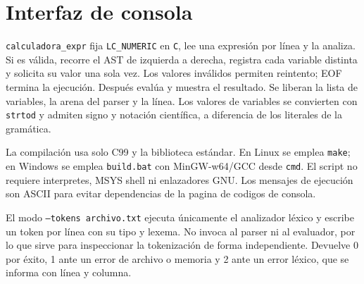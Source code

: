 \documentclass[11pt,a4paper]{article}
\begin{document}
\section{Interfaz de consola}
\texttt{calculadora\_expr} fija \texttt{LC\_NUMERIC} en \texttt{C}, lee una expresión por línea y la analiza. Si es válida, recorre el AST de izquierda a derecha, registra cada variable distinta y solicita su valor una sola vez. Los valores inválidos permiten reintento; EOF termina la ejecución. Después evalúa y muestra el resultado. Se liberan la lista de variables, la arena del parser y la línea. Los valores de variables se convierten con \texttt{strtod} y admiten signo y notación científica, a diferencia de los literales de la gramática.

La compilación usa solo C99 y la biblioteca estándar. En Linux se emplea \texttt{make}; en Windows se emplea \texttt{build.bat} con MinGW-w64/GCC desde \texttt{cmd}. El script no requiere interpretes, MSYS shell ni enlazadores GNU. Los mensajes de ejecución son ASCII para evitar dependencias de la pagina de codigos de consola.

El modo \texttt{--tokens archivo.txt} ejecuta únicamente el analizador léxico y escribe un token por línea con su tipo y lexema. No invoca al parser ni al evaluador, por lo que sirve para inspeccionar la tokenización de forma independiente. Devuelve 0 por éxito, 1 ante un error de archivo o memoria y 2 ante un error léxico, que se informa con línea y columna.
\end{document}
